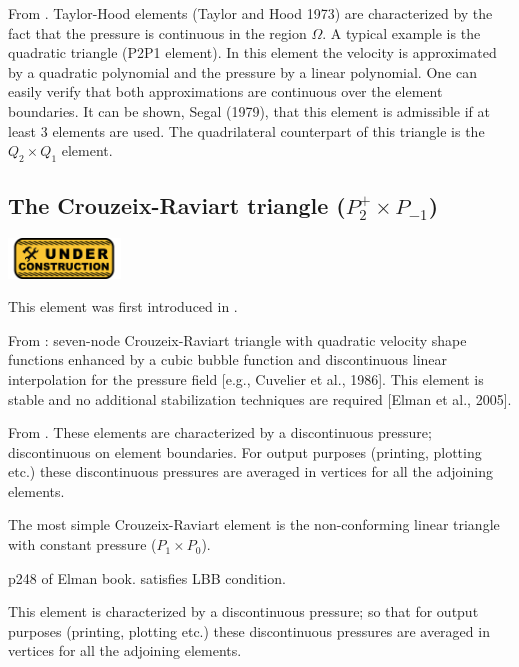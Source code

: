 From \cite{segal}.
Taylor-Hood elements (Taylor and Hood 1973) 
are characterized by the fact that the pressure is continuous in the region $\Omega$. 
A typical example is the quadratic triangle (P2P1 element).
In this element the velocity is approximated by a quadratic polynomial and the pressure by a
linear polynomial. One can easily verify that both approximations are continuous over 
the element boundaries. 
It can be shown, Segal (1979), that this element is admissible if at least 3 elements 
are used. The quadrilateral counterpart of this triangle is the $Q_2\times Q_1$ element.




\subsection{The Crouzeix-Raviart triangle ($P_2^+\times P_{-1}$)}
\includegraphics[width=3cm]{images/under_construction}

This element was first introduced in \cite{crra73}.

From \cite{daks08}: seven-node Crouzeix-Raviart triangle with quadratic velocity shape functions enhanced by a cubic bubble function and discontinuous linear interpolation for the pressure field [e.g., Cuvelier et al., 1986]. This element is stable and no additional stabilization techniques are required [Elman et al., 2005].

From \cite{segal}. These elements are characterized by a discontinuous pressure; 
discontinuous on element boundaries. 
For output purposes (printing, plotting etc.) these discontinuous pressures are averaged 
in vertices for all the adjoining elements.

The most simple Crouzeix-Raviart element is the non-conforming linear triangle 
with constant pressure ($P_1\times P_0$).

p248 of Elman book. satisfies LBB condition. 


This element is characterized by a discontinuous pressure; 
so that for output purposes (printing, plotting etc.) 
these discontinuous pressures are averaged in vertices for all the adjoining elements. 








